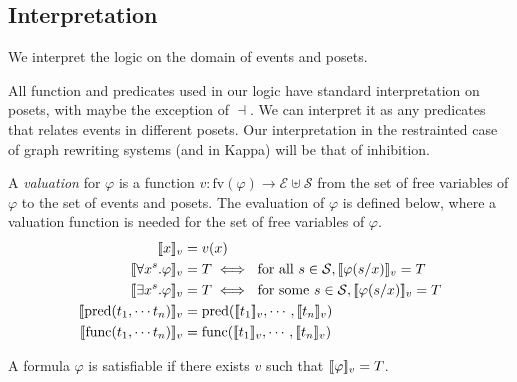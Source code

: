 \subsection{Interpretation}

We interpret the logic on the domain of events and posets.

All function and predicates used in our logic have standard interpretation on posets, with maybe the exception of $\dashv$. We can interpret it as any predicates that relates events in different posets. Our interpretation in the restrainted case of graph rewriting systems (and in Kappa) will be that of inhibition.

A \emph{valuation} for $\varphi$ is a function
$v:\text{fv}(\varphi)\to\mathcal{E}\uplus\mathcal{S}$
from the set of free variables of $\varphi$ to the set of events and posets.
%
The evaluation of $\varphi$ is defined below, where a valuation function is needed for the set of free variables of $\varphi$.
\begin{align*}
  \enc{x}_{v} &= v(x)\\
  \enc{\forall x^s.\varphi}_{v} &= T \iff\text{ for all }s\in\mathcal{S}, \enc{\varphi(s/x)}_{v} = T\\
  \enc{\exists x^s.\varphi}_{v} &= T \iff\text{ for some }s\in\mathcal{S}, \enc{\varphi(s/x)}_{v} = T\\
  \enc{\text{pred}(t_1,\cdots t_n)}_{v} &= \text{pred}(\enc{t_1}_{v},\cdots,\enc{t_n}_{v}) \\
  \enc{\text{func}(t_1,\cdots t_n)}_{v} &= \text{func}(\enc{t_1}_{v},\cdots,\enc{t_n}_{v}) \\
\end{align*}

A formula $\varphi$ is satisfiable if there exists $v$ such that $[\![\varphi]\!]_v = T$.

